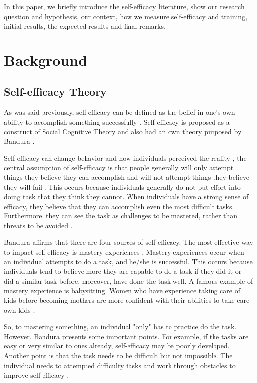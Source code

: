 \documentclass[10pt, conference]{IEEEtran}
\begin{document}
In this paper, we briefly introduce the self-efficacy literature, show our research question and hypothesis, our context, how we measure self-efficacy and training, initial results, the expected results and final remarks.


\section{Background}
\label{background}

\subsection{Self-efficacy Theory}
As was said previously, self-efficacy can be defined as the belief in one's own ability to accomplish something successfully  \cite{bandura1977self}. Self-efficacy is proposed as a construct of Social Cognitive Theory \cite{bandura1977social} and also had an own theory purposed by Bandura \cite{bandura1977self}. 

Self-efficacy can change behavior and how individuals perceived the reality \cite{bandura2010self}, the central assumption of self-efficacy is that people generally will only attempt things they believe they can accomplish and will not attempt things they believe they will fail \cite{bandura1977self}. This occurs because individuals generally do not put effort into doing task that they think they cannot. When individuals have a strong sense of efficacy, they believe that they can accomplish even the most difficult tasks. Furthermore, they can see the task as challenges to be mastered, rather than threats to be avoided \cite{bandura1994ramachaudran}.

Bandura affirms that there are four sources of self-efficacy. The most effective way to impact self-efficacy is mastery experiences \cite{bandura1994ramachaudran}. Mastery experiences occur when an individual attempts to do a task, and he/she is successful. This occurs because individuals tend to believe more they are capable to do a task if they did it or did a similar task before,  moreover, have done the task well. A famous example of mastery experience is babysitting. Women who have experience taking care of kids before becoming mothers are more confident with their abilities to take care own kids \cite{froman1989infant}.

So, to mastering something, an individual "only" has to practice do the task. However, Bandura \cite{bandura1994ramachaudran} presents some important points. For example, if the tasks are easy or very similar to ones already, self-efficacy may be poorly developed. Another point is that the task needs to be difficult but not impossible. The individual needs to attempted difficulty tasks and work through obstacles to improve self-efficacy \cite{bandura2010self}. 
\end{document}
